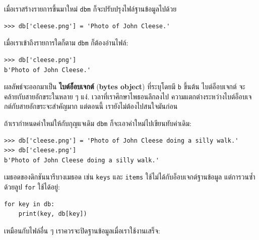 เมื่อเราสร้างรายการขึ้นมาใหม่ \texttt{dbm} ก็จะปรับปรุงไฟล์ฐานข้อมูลไปด้วย

\begin{verbatim}
>>> db['cleese.png'] = 'Photo of John Cleese.'
\end{verbatim}
%
%
เมื่อเราเข้าถึงรายการใดก็ตาม \texttt{dbm} ก็ต้องอ่านไฟล์:

\begin{verbatim}
>>> db['cleese.png']
b'Photo of John Cleese.'
\end{verbatim}
%
%
ผลลัพธ์จะออกมาเป็น \textbf{ไบต์อ็อบเจกต์} (\textbf{bytes object})
ที่ระบุโดยมี \texttt{b} ขึ้นต้น
ไบต์อ็อบเจกต์ จะคล้ายกับสายอักขระในหลาย ๆ แง่.
เวลาที่เราศึกษาไพธอนลึกลงไป
ความแตกต่างระหว่างไบต์อ็อบเจกต์กับสายอักขระจะสำคัญมาก
แต่ตอนนี้ เรายังไม่ต้องไปสนใจมันก่อน


ถ้าเรากำหนดค่าใหม่ให้กับกุญแจเดิม 
\texttt{dbm} ก็จะเอาค่าใหม่ไปเขียนทับค่าเดิม:

\begin{verbatim}
>>> db['cleese.png'] = 'Photo of John Cleese doing a silly walk.'
>>> db['cleese.png']
b'Photo of John Cleese doing a silly walk.'
\end{verbatim}
%


เมธอดของดิกชันนารีบางเมธอด เช่น \texttt{keys} และ \texttt{items} ใช้ไม่ได้กับอ็อบเจกต์ฐานข้อมูล
แต่การวนซ้ำด้วยลูป \texttt{for} ใช้ได้อยู่:

\begin{verbatim}
for key in db:
    print(key, db[key])
\end{verbatim}
%
%
เหมือนกับไฟล์อื่น ๆ
เราควรจะปิดฐานข้อมูลเมื่อเราใช้งานเสร็จ:

